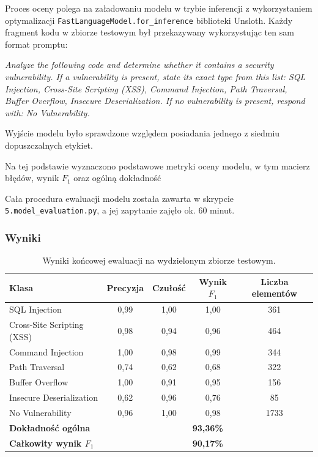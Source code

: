 \documentclass[12pt,a4paper]{article}
\begin{document}
Proces oceny polega na załadowaniu modelu w trybie inferencji z wykorzystaniem optymalizacji \texttt{FastLanguageModel.for\_inference} biblioteki
Unsloth. Każdy fragment kodu w zbiorze testowym był przekazywany wykorzystując ten sam format promptu:

\emph{
Analyze the following code and determine whether it contains a security vulnerability. 
If a vulnerability is present, state its exact type from this list: 
SQL Injection, Cross-Site Scripting (XSS), Command Injection, Path Traversal, 
Buffer Overflow, Insecure Deserialization. 
If no vulnerability is present, respond with: No Vulnerability.
}

Wyjście modelu było sprawdzone względem posiadania jednego z siedmiu dopuszczalnych etykiet. 

Na tej podstawie wyznaczono podstawowe metryki oceny modelu, w tym macierz błędów, wynik $F_1$ oraz ogólną dokładność

Cała procedura ewaluacji modelu została zawarta w skrypcie \texttt{5.model\_evaluation.py}, a jej zapytanie zajęło ok. 60 minut.

\subsubsection{Wyniki}

\begin{table}[H]
    \centering
    \begin{tabular}{lcccc}
        \toprule
        \textbf{Klasa} & \textbf{Precyzja} & \textbf{Czułość} & \textbf{Wynik $F_1$} & \textbf{Liczba elementów} \\
        \midrule
        SQL Injection               & 0,99 & 1,00 & 1,00 & 361 \\
        Cross-Site Scripting (XSS)  & 0,98 & 0,94 & 0,96 & 464 \\
        Command Injection           & 1,00 & 0,98 & 0,99 & 344 \\
        Path Traversal              & 0,74 & 0,62 & 0,68 & 322 \\
        Buffer Overflow             & 1,00 & 0,91 & 0,95 & 156 \\
        Insecure Deserialization    & 0,62 & 0,96 & 0,76 & 85 \\
        No Vulnerability            & 0,96 & 1,00 & 0,98 & 1733 \\
        \midrule
        \textbf{Dokładność ogólna}  & \multicolumn{4}{c}{\textbf{93,36\%}} \\
        \midrule
        \textbf{Całkowity wynik $F_1$}  & \multicolumn{4}{c}{\textbf{90,17\%}} \\
        \bottomrule
    \end{tabular}
    \caption{Wyniki końcowej ewaluacji na wydzielonym zbiorze testowym.}
\end{table}
\end{document}
